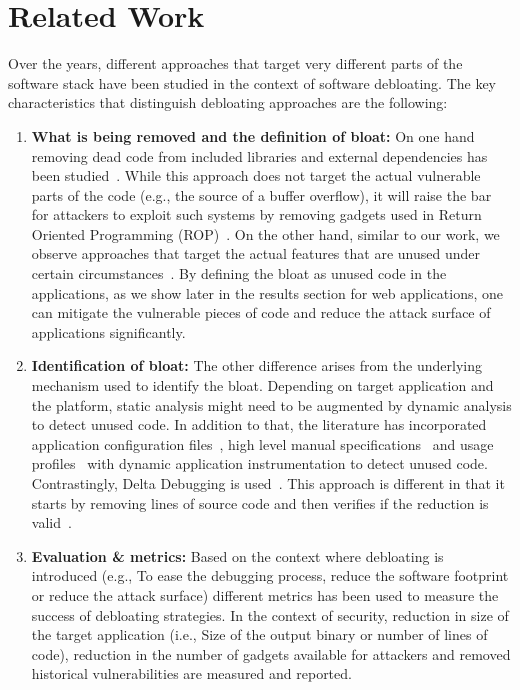 
\chapter{Related Work\label{ch:pastwork}}

Over the years, different approaches that target very different parts of the
software stack have been studied in the context of software debloating. The key characteristics that distinguish debloating approaches are the following:

\begin{enumerate}
  \item{\textbf{What is being removed and the definition of bloat:} On one hand removing dead code from included libraries and external dependencies has been studied~\cite{jiang2016Jred, jiang2018reddroid, quach2018debloating}. While this approach does not
  target the actual vulnerable parts of the code (e.g., the source of a buffer overflow), it will raise the bar for attackers to exploit such systems by removing gadgets used in Return Oriented Programming (ROP)~\cite{shacham2007geometry}.
  On the other hand, similar to our work, we observe approaches that target the actual features that are unused under certain circumstances~\cite{boomsma2012Dead, heo2018effective, regehr2012CReduce, Snyder2017, sun2018perses}. By defining the bloat as unused code in the applications, as we show later in the results section for web applications, one can mitigate the vulnerable pieces of code and reduce the attack surface of applications significantly.}
  \item{\textbf{Identification of bloat:} The other difference arises from the underlying mechanism used to identify the bloat. Depending on target application and the platform, static analysis might need to be augmented by dynamic analysis to detect
  unused code. In addition to that, the literature has incorporated application configuration files~\cite{Koo:2019:CSD:3301417.3312501}, high level manual specifications~\cite{heo2018effective, sharif2018Trimmer} and usage profiles~\cite{boomsma2012Dead} with dynamic application instrumentation to detect unused code. Contrastingly, Delta Debugging is used~\cite{zeller2002Delta}. This approach is different in that it starts by removing lines of source code and then verifies if the reduction is valid~\cite{heo2018effective, regehr2012CReduce, sun2018perses}.}
  \item{\textbf{Evaluation \& metrics:} Based on the context where debloating is introduced (e.g., To ease the debugging process, reduce the software footprint or reduce the attack surface) different metrics has been used to measure the success of debloating strategies. In the context of security, reduction in size of the target application (i.e., Size of the output binary or number of lines of code), reduction in the number of gadgets available for attackers and removed historical vulnerabilities are measured and reported.}
\end{enumerate}


